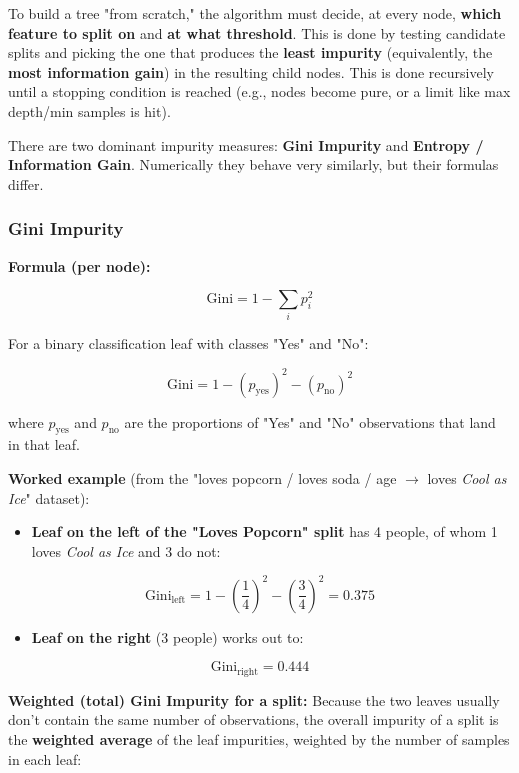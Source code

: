 \documentclass[12pt,openany]{book}
\begin{document}
To build a tree "from scratch," the algorithm must decide, at every node, \textbf{which feature to split on} and \textbf{at what threshold}. This is done by testing candidate splits and picking the one that produces the \textbf{least impurity} (equivalently, the \textbf{most information gain}) in the resulting child nodes. This is done recursively until a stopping condition is reached (e.g., nodes become pure, or a limit like max depth/min samples is hit).

There are two dominant impurity measures: \textbf{Gini Impurity} and \textbf{Entropy / Information Gain}. Numerically they behave very similarly, but their formulas differ.

\subsubsection{Gini Impurity}


\textbf{Formula (per node):}

\[
\text{Gini} = 1 - \sum_i p_i^2
\]


For a binary classification leaf with classes "Yes" and "No":

\[
\text{Gini} = 1 - (p_{\text{yes}})^2 - (p_{\text{no}})^2
\]


where \(p_{\text{yes}}\) and \(p_{\text{no}}\) are the proportions of "Yes" and "No" observations that land in that leaf.

\textbf{Worked example} (from the "loves popcorn / loves soda / age \(\rightarrow\) loves \textit{Cool as Ice}" dataset):

\begin{itemize}[leftmargin=*]
    \item \textbf{Leaf on the left of the "Loves Popcorn" split} has 4 people, of whom 1 loves \textit{Cool as Ice} and 3 do not:
\end{itemize}

\[
\text{Gini}_{\text{left}} = 1 - \left(\frac{1}{4}\right)^2 - \left(\frac{3}{4}\right)^2 = 0.375
\]

\begin{itemize}[leftmargin=*]
    \item \textbf{Leaf on the right} (3 people) works out to:
\end{itemize}

\[
\text{Gini}_{\text{right}} = 0.444
\]


\textbf{Weighted (total) Gini Impurity for a split:} Because the two leaves usually don't contain the same number of observations, the overall impurity of a split is the \textbf{weighted average} of the leaf impurities, weighted by the number of samples in each leaf:
\end{document}
